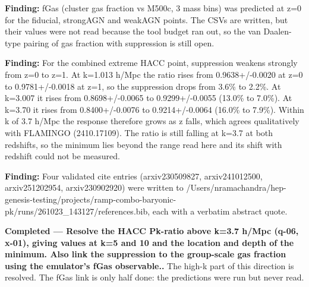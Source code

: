 \documentclass[11pt,a4paper]{article}
\begin{document}
\textbf{Finding:} fGas (cluster gas fraction vs M500c, 3 mass bins) was predicted at z=0 for the fiducial, strongAGN and weakAGN points. The CSVs are written, but their values were not read because the tool budget ran out, so the van Daalen-type pairing of gas fraction with suppression is still open.

\textbf{Finding:} For the combined extreme HACC point, suppression weakens strongly from z=0 to z=1. At k=1.013 h/Mpc the ratio rises from 0.9638+/-0.0020 at z=0 to 0.9781+/-0.0018 at z=1, so the suppression drops from 3.6\% to 2.2\%. At k=3.007 it rises from 0.8698+/-0.0065 to 0.9299+/-0.0055 (13.0\% to 7.0\%). At k=3.70 it rises from 0.8400+/-0.0076 to 0.9214+/-0.0064 (16.0\% to 7.9\%). Within k of 3.7 h/Mpc the response therefore grows as z falls, which agrees qualitatively with FLAMINGO (2410.17109). The ratio is still falling at k=3.7 at both redshifts, so the minimum lies beyond the range read here and its shift with redshift could not be measured.

\textbf{Finding:} Four validated cite entries (arxiv230509827, arxiv241012500, arxiv251202954, arxiv230902920) were written to /Users/nramachandra/hep-genesis-testing/projects/ramp-combo-baryonic-pk/runs/261023\_143127/references.bib, each with a verbatim abstract quote.

\textbf{Completed --- Resolve the HACC Pk-ratio above k=3.7 h/Mpc (q-06, x-01), giving values at k=5 and 10 and the location and depth of the minimum. Also link the suppression to the group-scale gas fraction using the emulator's fGas observable..} The high-k part of this direction is resolved. The fGas link is only half done: the predictions were run but never read.
\end{document}
